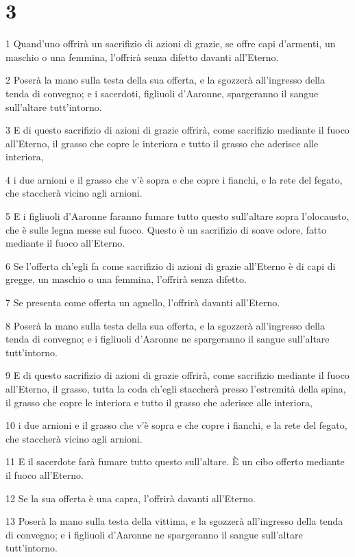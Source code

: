 \chapter{3}

\par 1 Quand'uno offrirà un sacrifizio di azioni di grazie, se offre capi d'armenti, un maschio o una femmina, l'offrirà senza difetto davanti all'Eterno.
\par 2 Poserà la mano sulla testa della sua offerta, e la sgozzerà all'ingresso della tenda di convegno; e i sacerdoti, figliuoli d'Aaronne, spargeranno il sangue sull'altare tutt'intorno.
\par 3 E di questo sacrifizio di azioni di grazie offrirà, come sacrifizio mediante il fuoco all'Eterno, il grasso che copre le interiora e tutto il grasso che aderisce alle interiora,
\par 4 i due arnioni e il grasso che v'è sopra e che copre i fianchi, e la rete del fegato, che staccherà vicino agli arnioni.
\par 5 E i figliuoli d'Aaronne faranno fumare tutto questo sull'altare sopra l'olocausto, che è sulle legna messe sul fuoco. Questo è un sacrifizio di soave odore, fatto mediante il fuoco all'Eterno.
\par 6 Se l'offerta ch'egli fa come sacrifizio di azioni di grazie all'Eterno è di capi di gregge, un maschio o una femmina, l'offrirà senza difetto.
\par 7 Se presenta come offerta un agnello, l'offrirà davanti all'Eterno.
\par 8 Poserà la mano sulla testa della sua offerta, e la sgozzerà all'ingresso della tenda di convegno; e i figliuoli d'Aaronne ne spargeranno il sangue sull'altare tutt'intorno.
\par 9 E di questo sacrifizio di azioni di grazie offrirà, come sacrifizio mediante il fuoco all'Eterno, il grasso, tutta la coda ch'egli staccherà presso l'estremità della spina, il grasso che copre le interiora e tutto il grasso che aderisce alle interiora,
\par 10 i due arnioni e il grasso che v'è sopra e che copre i fianchi, e la rete del fegato, che staccherà vicino agli arnioni.
\par 11 E il sacerdote farà fumare tutto questo sull'altare. È un cibo offerto mediante il fuoco all'Eterno.
\par 12 Se la sua offerta è una capra, l'offrirà davanti all'Eterno.
\par 13 Poserà la mano sulla testa della vittima, e la sgozzerà all'ingresso della tenda di convegno; e i figliuoli d'Aaronne ne spargeranno il sangue sull'altare tutt'intorno.
